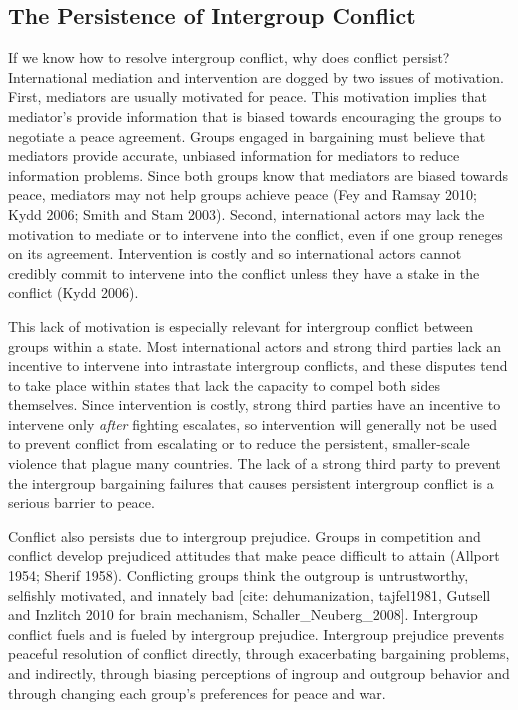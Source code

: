 \documentclass[11pt]{article}
\begin{document}
\subsection{The Persistence of Intergroup
Conflict}\label{the-persistence-of-intergroup-conflict}

If we know how to resolve intergroup conflict, why does conflict
persist? International mediation and intervention are dogged by two
issues of motivation. First, mediators are usually motivated for peace.
This motivation implies that mediator's provide information that is
biased towards encouraging the groups to negotiate a peace agreement.
Groups engaged in bargaining must believe that mediators provide
accurate, unbiased information for mediators to reduce information
problems. Since both groups know that mediators are biased towards
peace, mediators may not help groups achieve peace (Fey and Ramsay 2010;
Kydd 2006; Smith and Stam 2003). Second, international actors may lack
the motivation to mediate or to intervene into the conflict, even if one
group reneges on its agreement. Intervention is costly and so
international actors cannot credibly commit to intervene into the
conflict unless they have a stake in the conflict (Kydd 2006).

This lack of motivation is especially relevant for intergroup conflict
between groups within a state. Most international actors and strong
third parties lack an incentive to intervene into intrastate intergroup
conflicts, and these disputes tend to take place within states that lack
the capacity to compel both sides themselves. Since intervention is
costly, strong third parties have an incentive to intervene only
\emph{after} fighting escalates, so intervention will generally not be
used to prevent conflict from escalating or to reduce the persistent,
smaller-scale violence that plague many countries. The lack of a strong
third party to prevent the intergroup bargaining failures that causes
persistent intergroup conflict is a serious barrier to peace.

Conflict also persists due to intergroup prejudice. Groups in
competition and conflict develop prejudiced attitudes that make peace
difficult to attain (Allport 1954; Sherif 1958). Conflicting groups
think the outgroup is untrustworthy, selfishly motivated, and innately
bad {[}cite: dehumanization, tajfel1981, Gutsell and Inzlitch 2010 for
brain mechanism, Schaller\_Neuberg\_2008{]}. Intergroup conflict fuels
and is fueled by intergroup prejudice. Intergroup prejudice prevents
peaceful resolution of conflict directly, through exacerbating
bargaining problems, and indirectly, through biasing perceptions of
ingroup and outgroup behavior and through changing each group's
preferences for peace and war.
\end{document}
